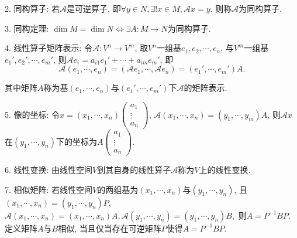   2. 同构算子: 若$\mathscr{A}$是可逆算子, 即$\forall y \in N , \exists ! x\in M,\mathscr{A}x=y$, 则称$\mathscr{A}$为同构算子.
  
  3. 同构定理: $\dim M=\dim N \Leftrightarrow \exists A:M\rightarrow N$为同构算子.

  4. 线性算子矩阵表示: 令$\mathscr{A}: V^n \rightarrow V^m$, 取$V^n$一组基$e_1,e_2,\cdots,e_n$, 
  与$V^m$一组基$e_1',e_2',\cdots,e_m'$, 则$\mathscr{A} e_i=a_{i1}e_1'+\cdots+a_{im}e_m'$, 即
  \begin{equation*}
    \mathscr{A}(e_1,\cdots,e_n)=(\mathscr{A} e_1,\cdots,\mathscr{A} e_n)=(e_1',\cdots,e_m')A.
  \end{equation*}

  其中矩阵$A$称为基$(e_1,\cdots,e_n)$与$(e_1',\cdots,e_m')$下$\mathscr{A}$的矩阵表示.

  5. 像的坐标: 令$x=(x_1,\cdots,x_n)\begin{pmatrix}
      a_1\\
      \vdots\\
      a_n
  \end{pmatrix}$, $\mathscr{A}(x_1,\cdots,x_n)=(y_1,\cdots,y_m)A$, 
  则$\mathscr{A} x$在$(y_1,\cdots,y_n)$下的坐标为$A\begin{pmatrix}
    a_1\\
    \vdots\\
    a_n
  \end{pmatrix}$.

  6. 线性变换: 由线性空间$V$到其自身的线性算子$\mathscr{A}$称为$V$上的线性变换.

  7. 相似矩阵: 若线性空间$V$的两组基为$(x_1,\cdots,x_n)$与$(y_1,\cdots,y_n)$, 且$(x_1,\cdots,x_n)=(y_1,\cdots,y_n)P$, 
  $\mathscr{A}(x_1,\cdots,x_n)=(x_1,\cdots,x_n)A, \mathscr{A}(y_1,\cdots,y_n)=(y_1,\cdots,y_n)B,$ 则$A=P^{-1}BP$. 
  定义矩阵$A$与$B$相似, 当且仅当存在可逆矩阵$P$使得$A=P^{-1}BP$.
  
  
